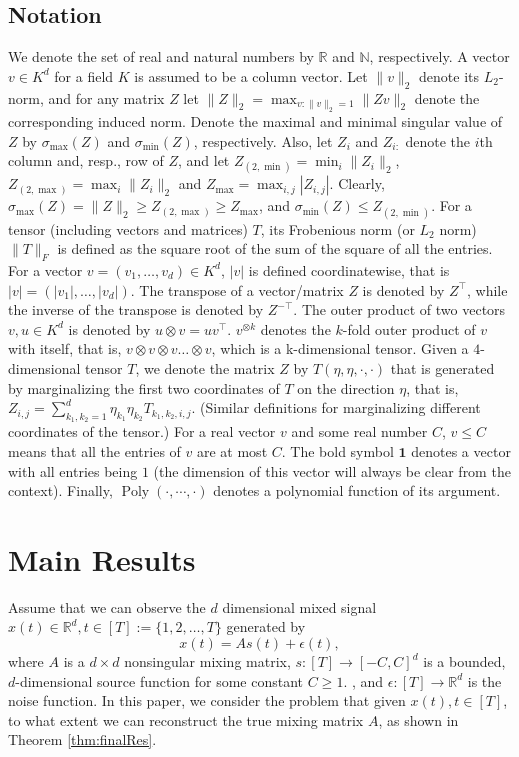 \documentclass{article} %
\newcommand{\real}{\mathbb{R}}
\renewcommand{\natural}{\mathbb{N}}
\DeclareMathOperator{\pol}{Poly}
\newcommand{\poly}[1]{\pol\left(#1\right)}
\theoremstyle{definition}
\begin{document}
\subsection{Notation}
We denote the set of real and natural numbers by $\real$ and $\natural$, respectively.
A vector $v \in K^d$ for a field $K$ is assumed to be a column vector.
Let $\|v\|_2$ denote its $L_2$-norm, and for any matrix $Z$ let $\|Z\|_2=\max_{v:\|v\|_2=1}{\|Z v\|_2}$ denote the corresponding induced norm. Denote the maximal and minimal singular value of $Z$ by $\sigma_{\max}(Z)$ and  $\sigma_{\min}(Z)$, respectively. Also, let $Z_i$ and $Z_{i:}$ denote the $i$th column and, resp., row of $Z$, and let $Z_{(2,\min)} = \min_{i} \|Z_i\|_2$, $Z_{(2,\max)} = \max_{i} \|Z_i\|_2$ and $Z_{\max} = \max_{i,j} |Z_{i,j}|$. 
Clearly, $\sigma_{\max}(Z) =\|Z\|_2 \ge Z_{(2,\max)} \ge Z_{\max}$, and $\sigma_{\min}(Z) \le Z_{(2,\min)}$. For a tensor (including vectors and matrices) $T$, its Frobenious norm (or $L_2$ norm) $\|T\|_F$  is defined as the square root of the sum of the square of all the entries.  
For a vector $v=(v_1,\ldots,v_d) \in K^d$, $\vert v \vert$ is defined coordinatewise, that is $\vert v \vert=(\vert v_1 \vert,\ldots,\vert v_d\vert)$. 
The transpose of a vector/matrix $Z$ is denoted by $Z^\top$, while the inverse of the transpose is denoted by $Z^{-\top}$.  
The outer product of two vectors $v, u \in K^d$ is denoted by $u\otimes v=u v^\top$. 
$v^{\otimes k}$ denotes the $k$-fold outer product of $v$ with itself, that is, $v\otimes v\otimes v \ldots \otimes v$, which is a k-dimensional tensor.
Given a $4$-dimensional tensor $T$, we denote the matrix $Z$ by $T(\eta,\eta,\cdot , \cdot)$ that is generated by marginalizing the first two coordinates of $T$ on the direction $\eta$, that is,
$Z_{i,j} = \sum_{k_1,k_2 = 1}^{d} \eta_{k_1} \eta_{k_2} T_{k_1,k_2,i,j}$. (Similar definitions for marginalizing different coordinates of the tensor.)
For a real vector $v$ and some real number $C$, $v \le C$ means that all the entries of $v$ are at most $C$. 
The bold symbol $\boldsymbol{1}$ denotes a vector with all entries being $1$ (the dimension of this vector will always be clear from the context).
Finally, $\poly{\cdot,\cdots,\cdot}$ denotes a polynomial function of its argument.

\section{Main Results}
\label{sec:main}
Assume that we can observe the $d$ dimensional mixed signal $x(t) \in \real^d, t \in [T]:=\{1,2,\ldots,T\}$ generated by  
\vspace{-2mm}
\begin{equation}
\label{eq:ICA}
x(t) = As(t)+\epsilon(t),
\end{equation}
where $A$ is a $d\times d$ nonsingular mixing matrix,  $s:[T] \to [-C,C]^d$ is a bounded, $d$-dimensional source function for some constant $C \ge 1$. , and $\epsilon:[T] \to \real^d$ is the noise function. 
In this paper, we consider the problem that given $x(t), t\in [T]$, to what extent we can reconstruct the true mixing matrix $A$, as shown in Theorem \ref{thm:finalRes}.
\end{document}
